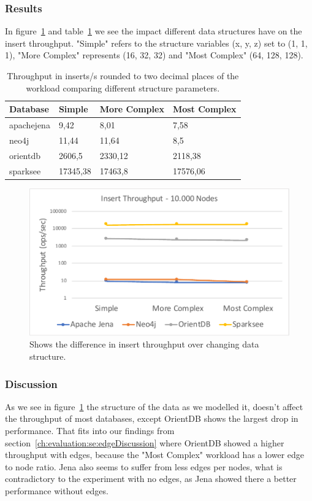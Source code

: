 \subsubsection{Results}
In figure~\ref{fig:structure} and table~\ref{tab:structure} we see the impact different data structures have on the insert throughput.
"Simple" refers to the structure variables (x, y, z) set to (1, 1, 1),
"More Complex" represents (16, 32, 32) and "Most Complex" (64, 128, 128).

\begin{table}[h!]
  \begin{minipage}{\textwidth}
    \centering
    \begin{tabularx}{\textwidth}{ | l | X | X | X | }
      \hline
      Database & Simple & More Complex & Most Complex \\ \hline
      apachejena & 9,42 & 8,01 & 7,58 \\ \hline
      neo4j & 11,44 & 11,64 & 8,5 \\ \hline
      orientdb & 2606,5 & 2330,12 & 2118,38 \\ \hline
      sparksee & 17345,38 & 17463,8 & 17576,06 \\ \hline
    \end{tabularx}
  \end{minipage}
  \caption{Throughput in inserts/s rounded to two decimal places of the workload comparing different structure parameters.}
  \label{tab:structure}
\end{table}

\begin{figure}[h!]
  \centering
  \includegraphics[width=.75\textwidth]{images/production/structure}
  \caption{Shows the difference in insert throughput over changing data structure.}
  \label{fig:structure}
\end{figure}

\subsubsection{Discussion}
As we see in figure~\ref{fig:structure} the structure of the data as we modelled it,
doesn't affect the throughput of most databases, except OrientDB shows the largest drop in performance.
That fits into our findings from section~\ref{ch:evaluation:se:edgeDiscussion} where OrientDB showed a higher throughput with edges,
because the "Most Complex" workload has a lower edge to node ratio.
Jena also seems to suffer from less edges per nodes,
what is contradictory to the experiment with no edges,
as Jena showed there a better performance without edges.

